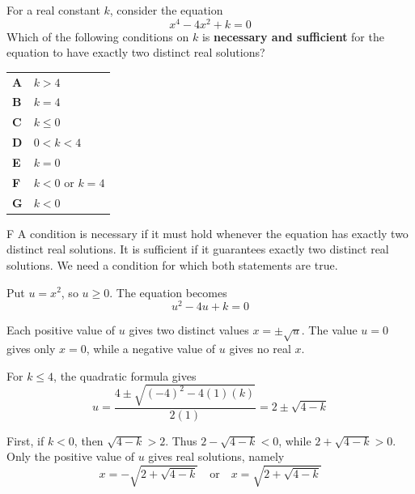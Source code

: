\documentclass[11pt,a4paper]{article}
\begin{document}
\thispagestyle{djssolutions}
\djsFrontMatter
\clearpage
\thispagestyle{djssolutions}
\vspace*{8pt}
\begin{enumerate}[label=\textbf{\arabic*.},leftmargin=*,itemsep=0pt,start=1]
\questionitem[Polynomials]
For a real constant $k$, consider the equation \[ x^4-4x^2+k=0 \] Which of the following conditions on $k$ is \textbf{necessary and sufficient} for the equation to have exactly two distinct real solutions?

\par\vspace*{12pt}
\begin{tabularx}{\linewidth}{@{}>{\bfseries}l Y@{}}
A &
$k>4$
\\[0.8em]
B &
$k=4$
\\[0.8em]
C &
$k\leq0$
\\[0.8em]
D &
$0<k<4$
\\[0.8em]
E &
$k=0$
\\[0.8em]
F &
$k<0$ or $k=4$
\\[0.8em]
G &
$k<0$
\\
\end{tabularx}

\begin{djsSolution}{F}
A condition is necessary if it must hold whenever the equation has exactly two distinct real solutions. It is sufficient if it guarantees exactly two distinct real solutions. We need a condition for which both statements are true.

Put $u=x^2$, so $u\geq0$. The equation becomes
\[
u^2-4u+k=0
\]

Each positive value of $u$ gives two distinct values $x=\pm\sqrt{u}$. The value $u=0$ gives only $x=0$, while a negative value of $u$ gives no real $x$.

For $k\leq4$, the quadratic formula gives
\[
u=\frac{4\pm\sqrt{(-4)^2-4(1)(k)}}{2(1)}
=2\pm\sqrt{4-k}
\]

First, if $k<0$, then $\sqrt{4-k}>2$. Thus $2-\sqrt{4-k}<0$, while $2+\sqrt{4-k}>0$. Only the positive value of $u$ gives real solutions, namely
\[
x=-\sqrt{2+\sqrt{4-k}}\quad\text{or}\quad x=\sqrt{2+\sqrt{4-k}}
\]


\end{djsSolution}
\end{enumerate}
\end{document}
